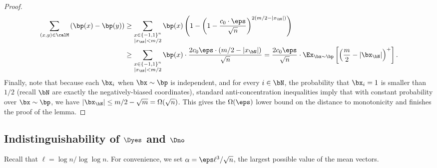 \begin{proof}
\begin{align*}
\sum_{(x,y) \in \calM} \left( \bp(x) - \bp(y) \right) &\geq \sum_{\substack{x \in \{-1,1\}^{n} \\ |x_{\bN}| < m/2 }} \bp(x) \left( 1 - \left( 1 - \frac{c_0 \cdot \eps}{\sqrt{n}}\right)^{2(m/2-|x_{\bN}|)}\right) \\
            &\geq \sum_{\substack{x \in \{-1,1\}^n \\ |x_{\bN}| < m/2}} \bp(x) \cdot \frac{2 c_0 \eps \cdot (m/2 - |x_{\bN}|)}{\sqrt{n}} = \frac{2c_0\eps}{\sqrt{n}}\cdot  \Ex_{\bx \sim \bp}\left[ \left(\frac{m}{2} - |\bx_{\bN}| \right)^+\right].
\end{align*}
Finally, note that because each $\bx_i$ when $\bx \sim \bp$ is independent, and for every $i \in \bN$, the probability that $\bx_i = 1$ is smaller than $1/2$ (recall $\bN$ are exactly the negatively-biased coordinates), standard anti-concentration inequalities imply that with constant probability over $\bx \sim \bp$, we have $|\bx_{\bN}| \leq m/2 - \sqrt{m} = \Omega(\sqrt{n})$. This gives the $\Omega(\eps)$ lower bound on the distance to monotonicity and finishes the proof of the lemma.
\end{proof}



\subsection{Indistinguishability of $\Dyes$ and $\Dno$}\label{sec:indist}

Recall that $\ell = \log n/\log\log n$. For convenience, we set $\alpha = \eps \ell^3/\sqrt{n}$,
the largest possible value of the mean vectors.


